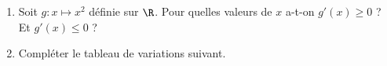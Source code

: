 \documentclass{article}
\begin{document}
\begin{example}
\begin{enumerate}[label=\emph{\alph*)}]
\item Soit $g \colon x \mapsto x^2$ définie sur $\R$. Pour quelles valeurs de $x$ a-t-on $g'(x) \geq 0$ ? Et $g'(x) \leq 0$ ?

\emptybox{2cm}
\item Compléter le tableau de variations suivant.
\begin{center}
\end{center}
\end{enumerate}
\end{example}
\newpage
\end{document}
